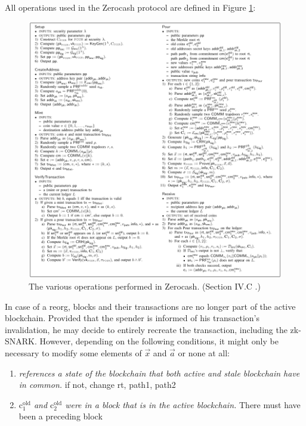 \documentclass{article}
\begin{document}
All operations used in the Zerocash protocol are defined in Figure \ref{fig:zerocash}:

\begin{figure}[H]
\includegraphics[width=\textwidth]{zerocash-zksnark.png}
\caption{The various operations performed in Zerocash. (Section IV.C \cite{bensasson:zerocash}.)} \label{fig:zerocash}
\centering
\end{figure}

In case of a reorg, blocks and their transactions are no longer part of the active blockchain.
Provided that the spender is informed of his transaction's invalidation, he may decide to entirely recreate the transaction, including the zk-SNARK.
However, depending on the following conditions, it might only be necessary to modify some elements of $\vec{x}$ and $\vec{a}$ or none at all:

\begin{enumerate}
        \item \textit{ references a state of the blockchain that both active and stale blockchain have in common.}
                if not, change rt, path1, path2
        \item \textit{$\text{c}_1^\text{old}$ and $\text{c}_2^\text{old}$ were in a block that is in the active blockchain.}
                There must have been a preceding block %
\end{enumerate}
\end{document}
